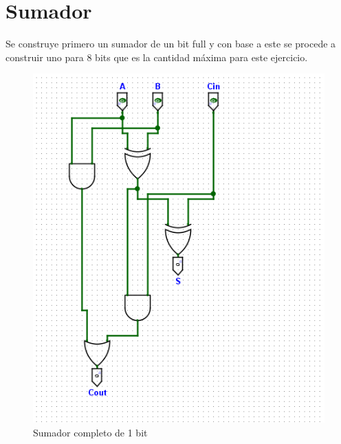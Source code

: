 \documentclass{article}
\begin{document}
\section{Sumador}
Se construye primero un sumador de un bit full y con base a este se procede a construir uno para 8 bits 
que es la cantidad máxima para este ejercicio.
\begin{figure}[h]
    \centering
    \begin{minipage}{0.45\textwidth} %
      \centering
      \includegraphics[width=\linewidth]{imagenes/sumador.png} %
      \caption{Sumador completo de 1 bit}
      \label{fig:sumador}
    \end{minipage}
    \hfill
    \begin{minipage}{0.45\textwidth} %
      \centering

\end{minipage}
\end{figure}
\end{document}
